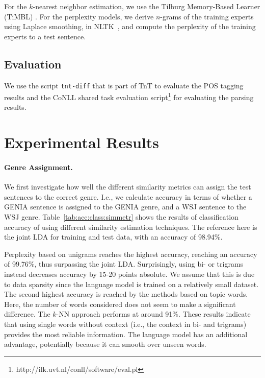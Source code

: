 For the $k$-nearest neighbor estimation, we use the Tilburg Memory-Based Learner (TiMBL) \cite{daelemans:zavrel:ea:10}. For the perplexity models, we derive $n$-grams  of the training experts using  Laplace smoothing, in NLTK~\cite{bird2009natural}, and compute the perplexity of the training experts to a test sentence.

\subsection{Evaluation}

We use the script \texttt{tnt-diff} that is part of TnT to evaluate the POS tagging results  and the CoNLL shared task evaluation script\footnote{http://ilk.uvt.nl/conll/software/eval.pl} for evaluating the parsing results.


\section{Experimental Results} \label{exptres}

\paragraph{Genre Assignment.}
We first investigate how well the different similarity metrics can assign the test sentences to the correct genre. I.e., we calculate accuracy in terms of whether a GENIA sentence is assigned to the GENIA genre, and a WSJ sentence to the WSJ genre.
Table~\ref{tab:acc:class:simmetr} shows the results of classification accuracy of using different similarity estimation techniques. The reference here is the joint LDA for training and test data, with an accuracy of 98.94\%. 
 
Perplexity based on unigrams reaches the highest accuracy, reaching an accuracy of 99.76\%, thus surpassing the joint LDA. Surprisingly, using bi- or trigrams instead decreases accuracy by 15-20 points absolute. We assume that this is due to data sparsity since the language model is trained on a relatively small dataset. The second highest accuracy is reached by the methods based on topic words. Here, the number of words considered does not seem to make a significant difference. The $k$-NN approach performs at around 91\%. These results indicate that using single words without context (i.e., the context in bi- and trigrams) provides the most reliable information. The language model has an additional advantage, potentially because it can smooth over unseen words.
  
